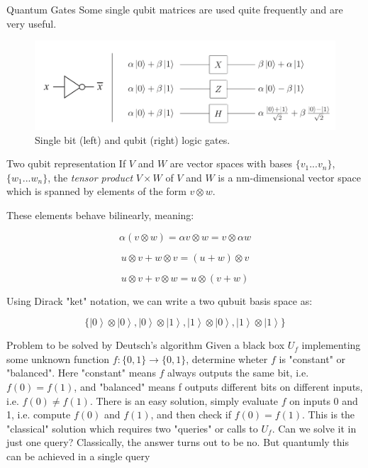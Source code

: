\documentclass{beamer}
\newcommand{\ket}[1]{\left| #1 \right>} %
\begin{document}
\begin{frame}{Quantum Gates}
	\justifying 
	Some single qubit matrices are used quite frequently and are very useful.
	\center
	\begin{figure}
		\includegraphics[keepaspectratio=true,width=.8\paperwidth]{.attachments/single_qubit.png}
		\caption{Single bit (left) and qubit (right) logic gates.}
	\end{figure}
\end{frame}

\begin{frame}{Two qubit representation}
	If $V$ and $W$ are vector spaces with bases $\{v_1...v_n\}$,$\{w_1...w_n\}$, the \textit{tensor product} $V \times W$ of $V$ and $W$ is a nm-dimensional vector space which is spanned by elements of the form $v\otimes w$.
	
	These elements behave bilinearly, meaning:
	
	$$
	\alpha(v \otimes w)=\alpha v \otimes w = v \otimes \alpha w 
	$$
	
	$$
	u \otimes v + w \otimes v = (u + w ) \otimes v
	$$
	
	$$
	u \otimes v + v \otimes w = u \otimes (v+w) 
	$$
	
	Using Dirack "ket" notation, we can write a two qubuit basis space as:
	
	$$
	\{\ket 0 \otimes \ket 0,\ket 0 \otimes \ket 1,\ket 1 \otimes \ket 0,\ket 1 \otimes \ket 1\}
	$$
\end{frame}



\begin{frame}{Problem to be solved by Deutsch's algorithm}
	\justifying 
	Given a black box $U_f$ implementing some unknown function $f : \{0, 1\}\rightarrow \{0, 1\}$, determine wheter $f$ is "constant" or "balanced". 
	\newline
	\newline
	Here "constant" means $f$ always outputs the same bit, i.e. $f(0)=f(1)$, and "balanced" means f outputs different bits on different inputs, i.e. $f(0) \neq f(1)$.
	\newline
	\newline
	There is an easy solution, simply evaluate $f$ on inputs 0 and 1, i.e. compute $f(0)$ and $f(1)$, and then check if $f(0)=f(1)$. This is the "classical" solution which requires two "queries" or calls to $U_f$. Can we solve it in just one query? 
	\newline
	\newline
	Classically, the answer turns out to be no. But quantumly this can be achieved in a single query
\end{frame}
\end{document}
